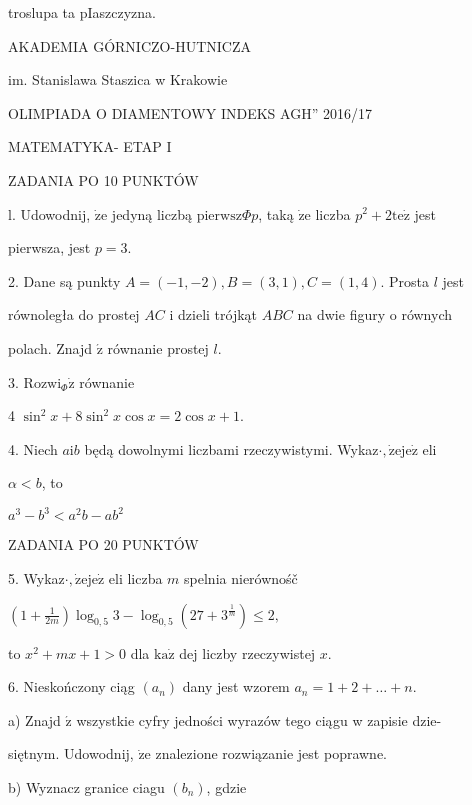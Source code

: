 \documentclass[a4paper,12pt]{article}
\begin{document}
troslupa ta pIaszczyzna.






AKADEMIA GÓRNICZO-HUTNICZA

im. Stanislawa Staszica w Krakowie

OLIMPIADA O DIAMENTOWY INDEKS AGH'' 2016/17

MATEMATYKA- ETAP I

ZADANIA PO 10 PUNKTÓW

l. Udowodnij, $\dot{\mathrm{z}}\mathrm{e}$ jedyną liczbą $\mathrm{p}\mathrm{i}\mathrm{e}\mathrm{r}\mathrm{w}\mathrm{s}\mathrm{z}\Phi p$, taką $\dot{\mathrm{z}}\mathrm{e}$ liczba $p^{2}+2\mathrm{t}\mathrm{e}\dot{\mathrm{z}}$ jest

pierwsza, jest $p=3.$

2. Dane są punkty $A = (-1,-2), B = (3,1), C = (1,4)$. Prosta $l$ jest

równoległa do prostej $AC$ i dzieli trójkąt $ABC$ na dwie figury o równych

polach. Znajd $\acute{\mathrm{z}}$ równanie prostej $l.$

3. $\mathrm{R}\mathrm{o}\mathrm{z}\mathrm{w}\mathrm{i}_{\Phi}\dot{\mathrm{z}}$ równanie

4 $\sin^{2}x+8\sin^{2}x\cos x=2\cos x+1.$

4. Niech $a\mathrm{i}b$ będą dowolnymi liczbami rzeczywistymi. Wykaz$\cdot, \dot{\mathrm{z}}\mathrm{e}\mathrm{j}\mathrm{e}\dot{\mathrm{z}}$ eli

$\alpha<b$, to

$a^{3}-b^{3}<a^{2}b-ab^{2}$

ZADANIA PO 20 PUNKTÓW

5. Wykaz$\cdot, \dot{\mathrm{z}}\mathrm{e}\mathrm{j}\mathrm{e}\dot{\mathrm{z}}$ eli liczba $m$ spelnia nierównośč

$(1+\displaystyle \frac{1}{2m})\log_{0,5}3-\log_{0,5}(27+3^{\frac{1}{m}})\leq 2,$

to $x^{2}+mx+1>0$ dla $\mathrm{k}\mathrm{a}\dot{\mathrm{z}}$ dej liczby rzeczywistej $x.$

6. Nieskończony ciąg $(a_{n})$ dany jest wzorem $a_{n}=1+2+\ldots+n.$

a) Znajd $\acute{\mathrm{z}}$ wszystkie cyfry jedności wyrazów tego ciągu w zapisie dzie-

siętnym. Udowodnij, $\dot{\mathrm{z}}\mathrm{e}$ znalezione rozwiązanie jest poprawne.

b) Wyznacz granice ciagu $(b_{n})$, gdzie
\end{document}
